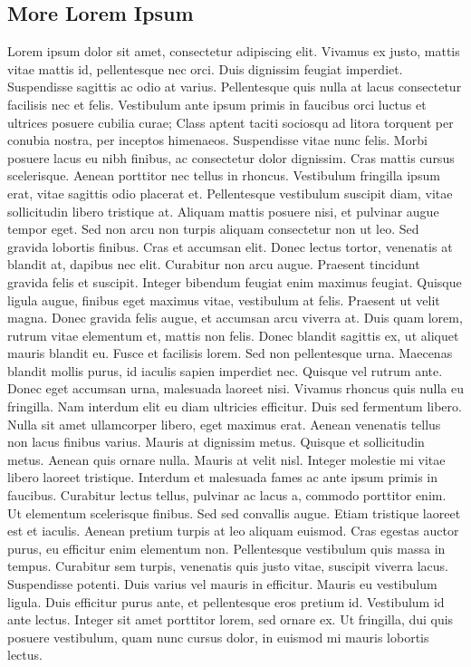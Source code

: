 \documentclass[ 6pt, a4paper, landscape ]{scrartcl}
\begin{document}
\begin{multicols}{4}
\begin{breakbox}
\subsection{More Lorem Ipsum}
Lorem ipsum dolor sit amet, consectetur adipiscing elit. Vivamus ex justo,
mattis vitae mattis id, pellentesque nec orci. Duis dignissim feugiat imperdiet.
Suspendisse sagittis ac odio at varius. Pellentesque quis nulla at lacus
consectetur facilisis nec et felis. Vestibulum ante ipsum primis in faucibus
orci luctus et ultrices posuere cubilia curae; Class aptent taciti sociosqu ad
litora torquent per conubia nostra, per inceptos himenaeos. Suspendisse vitae
nunc felis. Morbi posuere lacus eu nibh finibus, ac consectetur dolor dignissim.
Cras mattis cursus scelerisque. Aenean porttitor nec tellus in rhoncus.
Vestibulum fringilla ipsum erat, vitae sagittis odio placerat et. Pellentesque
vestibulum suscipit diam, vitae sollicitudin libero tristique at. Aliquam mattis
posuere nisi, et pulvinar augue tempor eget. Sed non arcu non turpis aliquam
consectetur non ut leo.
Sed gravida lobortis finibus. Cras et accumsan elit. Donec lectus tortor,
venenatis at blandit at, dapibus nec elit. Curabitur non arcu augue. Praesent
tincidunt gravida felis et suscipit. Integer bibendum feugiat enim maximus
feugiat. Quisque ligula augue, finibus eget maximus vitae, vestibulum at felis.
Praesent ut velit magna. Donec gravida felis augue, et accumsan arcu viverra at.
Duis quam lorem, rutrum vitae elementum et, mattis non felis. Donec blandit
sagittis ex, ut aliquet mauris blandit eu. Fusce et facilisis lorem. Sed non
pellentesque urna. Maecenas blandit mollis purus, id iaculis sapien imperdiet
nec.
Quisque vel rutrum ante. Donec eget accumsan urna, malesuada laoreet nisi.
Vivamus rhoncus quis nulla eu fringilla. Nam interdum elit eu diam ultricies
efficitur. Duis sed fermentum libero. Nulla sit amet ullamcorper libero, eget
maximus erat. Aenean venenatis tellus non lacus finibus varius. Mauris at
dignissim metus. Quisque et sollicitudin metus.
Aenean quis ornare nulla. Mauris at velit nisl. Integer molestie mi vitae libero
laoreet tristique. Interdum et malesuada fames ac ante ipsum primis in faucibus.
Curabitur lectus tellus, pulvinar ac lacus a, commodo porttitor enim. Ut
elementum scelerisque finibus. Sed sed convallis augue. Etiam tristique laoreet
est et iaculis.
Aenean pretium turpis at leo aliquam euismod. Cras egestas auctor purus, eu
efficitur enim elementum non. Pellentesque vestibulum quis massa in tempus.
Curabitur sem turpis, venenatis quis justo vitae, suscipit viverra lacus.
Suspendisse potenti. Duis varius vel mauris in efficitur. Mauris eu vestibulum
ligula. Duis efficitur purus ante, et pellentesque eros pretium id. Vestibulum
id ante lectus. Integer sit amet porttitor lorem, sed ornare ex. Ut fringilla,
dui quis posuere vestibulum, quam nunc cursus dolor, in euismod mi mauris
lobortis lectus.


\end{breakbox}
\end{multicols}
\end{document}
